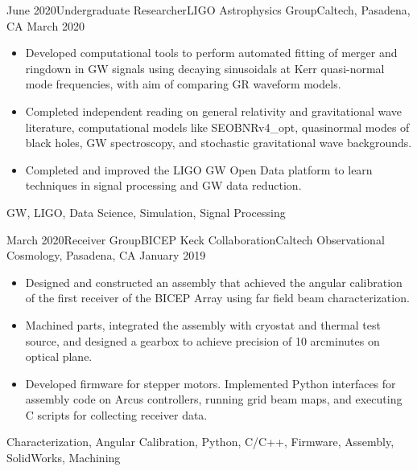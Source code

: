 \begin{experiences}
\experience
{June 2020}{Undergraduate Researcher}{LIGO Astrophysics Group}{Caltech, Pasadena, CA}
{March 2020} {
\begin{itemize}
\item Developed computational tools to perform automated fitting of merger and ringdown in GW signals using decaying sinusoidals at Kerr quasi-normal mode frequencies, with aim of comparing GR waveform models.
\item Completed independent reading on general relativity and gravitational wave literature, computational models like SEOBNRv4\_opt, quasinormal modes of black holes, GW spectroscopy, and stochastic gravitational wave backgrounds.
\item Completed and improved the LIGO GW Open Data platform to learn techniques in signal processing and GW data reduction.
\end{itemize}
}
{GW, LIGO, Data Science, Simulation, Signal Processing}
\end{experiences}
\begin{experiences}
\experience
{March 2020}{Receiver Group}{BICEP Keck Collaboration}{Caltech Observational Cosmology, Pasadena, CA}
{January 2019} {
\begin{itemize}
\item Designed and constructed an assembly that achieved the angular calibration of the first receiver of the BICEP Array using far field beam characterization.
\item Machined parts, integrated the assembly with cryostat and thermal test source, and designed a gearbox to achieve precision of 10 arcminutes on optical plane.
\item Developed firmware for stepper motors. Implemented Python interfaces for assembly code on Arcus controllers, running grid beam maps, and executing C scripts for collecting receiver data.
\end{itemize}
}
{Characterization, Angular Calibration, Python, C/C++, Firmware, Assembly, SolidWorks, Machining}
\end{experiences}
